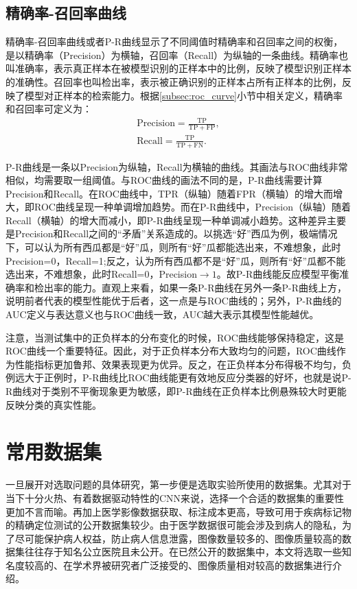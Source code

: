 \subsection{精确率-召回率曲线}\label{subsec:pr_curve}
精确率-召回率曲线或者P-R曲线显示了不同阈值时精确率和召回率之间的权衡，是以精确率（Precision）为横轴，召回率（Recall）为纵轴的一条曲线。精确率也叫准确率，表示真正样本在被模型识别的正样本中的比例，反映了模型识别正样本的准确性。召回率也叫检出率，表示被正确识别的正样本占所有正样本的比例，反映了模型对正样本的检索能力。根据\ref{subsec:roc_curve}小节中相关定义，精确率和召回率可定义为：
\begin{gather}
	\mathrm{Precision}=\frac{\mathrm{TP}}{\mathrm{TP}+\mathrm{FP}},\\
	\mathrm{Recall}=\frac{\mathrm{TP}}{\mathrm{TP}+\mathrm{FN}}.
\end{gather}

P-R曲线是一条以Precision为纵轴，Recall为横轴的曲线。其画法与ROC曲线非常相似，均需要取一组阈值。与ROC曲线的画法不同的是，P-R曲线需要计算Precision和Recall。在ROC曲线中，TPR（纵轴）随着FPR（横轴）的增大而增大，即ROC曲线呈现一种单调增加趋势。而在P-R曲线中，Precision（纵轴）随着Recall（横轴）的增大而减小，即P-R曲线呈现一种单调减小趋势。这种差异主要是Precision和Recall之间的“矛盾”关系造成的。以挑选“好”西瓜为例，极端情况下，可以认为所有西瓜都是“好”瓜，则所有“好”瓜都能选出来，不难想象，此时Precision=0，Recall=1;反之，认为所有西瓜都不是“好”瓜，则所有“好”瓜都不能选出来，不难想象，此时Recall=0，Precision$\to 1$。故P-R曲线能反应模型平衡准确率和检出率的能力。直观上来看，如果一条P-R曲线在另外一条P-R曲线上方，说明前者代表的模型性能优于后者，这一点是与ROC曲线的；另外，P-R曲线的AUC定义与表达意义也与ROC曲线一致，AUC越大表示其模型性能越优。

注意，当测试集中的正负样本的分布变化的时候，ROC曲线能够保持稳定，这是ROC曲线一个重要特征。因此，对于正负样本分布大致均匀的问题，ROC曲线作为性能指标更加鲁邦、效果表现更为优异。反之，在正负样本分布得极不均匀，负例远大于正例时，P-R曲线比ROC曲线能更有效地反应分类器的好坏，也就是说P-R曲线对于类别不平衡现象更为敏感，即P-R曲线在正负样本比例悬殊较大时更能反映分类的真实性能。

\section{常用数据集}\label{sec:usually_ds_intro}
一旦展开对选取问题的具体研究，第一步便是选取实验所使用的数据集。尤其对于当下十分火热、有着数据驱动特性的CNN来说，选择一个合适的数据集的重要性更加不言而喻。再加上医学影像数据获取、标注成本更高，导致可用于疾病标记物的精确定位测试的公开数据集较少。由于医学数据很可能会涉及到病人的隐私，为了尽可能保护病人权益，防止病人信息泄露，图像数量较多的、图像质量较高的数据集往往存于知名公立医院且未公开。在已然公开的数据集中，本文将选取一些知名度较高的、在学术界被研究者广泛接受的、图像质量相对较高的数据集进行介绍。

